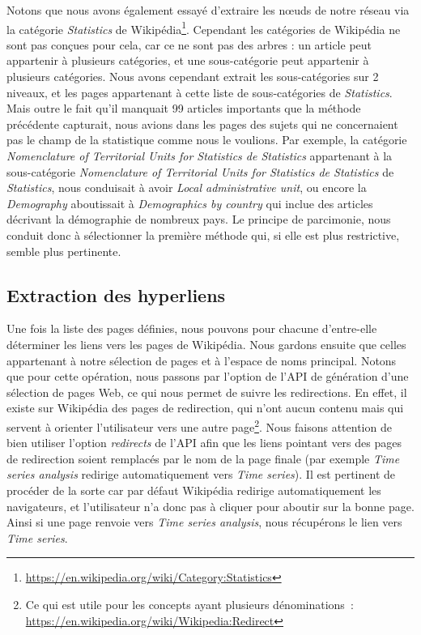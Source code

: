 \documentclass[a4paper]{article}
\begin{document}
Notons que nous avons également essayé d'extraire les nœuds de notre réseau via la catégorie \textit{Statistics} de Wikipédia\footnote{\url{https://en.wikipedia.org/wiki/Category:Statistics}}. Cependant les catégories de Wikipédia ne sont pas conçues pour cela, car ce ne sont pas des arbres : un article peut appartenir à plusieurs catégories, et une sous-catégorie peut appartenir à plusieurs catégories. Nous avons cependant extrait les sous-catégories sur 2 niveaux, et les pages appartenant à cette liste de sous-catégories de \textit{Statistics}. Mais outre le fait qu'il manquait 99 articles importants que la méthode précédente capturait, nous avions dans les pages des sujets qui ne concernaient pas le champ de la statistique comme nous le voulions. Par exemple, la catégorie \textit{Nomenclature of Territorial Units for Statistics de Statistics} appartenant à la sous-catégorie \textit{Nomenclature of Territorial Units for Statistics de Statistics} de \textit{Statistics}, nous conduisait à avoir \textit{Local administrative unit}, ou encore la \textit{Demography} aboutissait à \textit{Demographics by country} qui inclue des articles décrivant la démographie de nombreux pays. Le principe de parcimonie, nous conduit donc à sélectionner la première méthode qui, si elle est plus restrictive, semble plus pertinente.

    \subsection{Extraction des hyperliens}

Une fois la liste des pages définies, nous pouvons pour chacune d'entre-elle déterminer les liens vers les pages de Wikipédia. Nous gardons ensuite que celles appartenant à notre sélection de pages et à l'espace de noms principal. Notons que pour cette opération, nous passons par l'option de l'API de génération d'une sélection de pages Web, ce qui nous permet de suivre les redirections. En effet, il existe sur Wikipédia des pages de redirection, qui n'ont aucun contenu mais qui servent à orienter l'utilisateur vers une autre page\footnote{Ce qui est utile pour les concepts ayant plusieurs dénominations~: \url{https://en.wikipedia.org/wiki/Wikipedia:Redirect}}. Nous faisons attention de bien utiliser l'option \textit{redirects} de l'API afin que les liens pointant vers des pages de redirection soient remplacés par le nom de la page finale (par exemple \textit{Time series analysis} redirige automatiquement vers \textit{Time series}). Il est pertinent de procéder de la sorte car par défaut Wikipédia redirige automatiquement les navigateurs, et l'utilisateur n'a donc pas à cliquer pour aboutir sur la bonne page. Ainsi si une page renvoie vers \textit{Time series analysis}, nous récupérons le lien vers \textit{Time series}.
\end{document}
